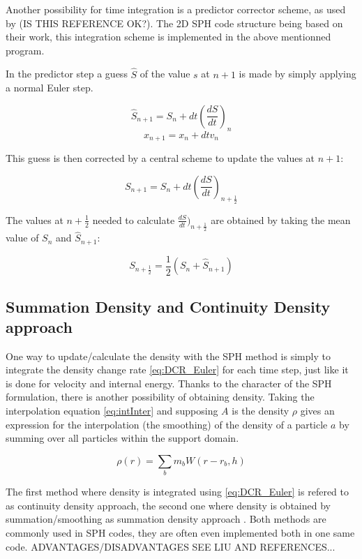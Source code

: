 \documentclass{report}
\begin{document}
Another possibility for time integration is a predictor corrector scheme, as
used by \cite{Hu2007}(IS THIS REFERENCE OK?). The 2D SPH code structure being based on their work,
this integration scheme is implemented in the above mentionned program.

In the predictor step a guess $\hat S$ of the value $s$ at $n+1$ is made by simply
applying a normal Euler step.

\begin{equation}
\hat S_{n+1}=S_n+dt\left(\frac{dS}{dt}\right)_n
\end{equation}
\begin{equation}
x_{n+1}=x_n+dt v_{n}
\end{equation}

This guess is then corrected by a central scheme to update the values at
$n+1$:

\begin{equation}
S_{n+1}=S_n+dt\left(\frac{dS}{dt}\right)_{n+\frac{1}{2}}
\end{equation}

The values at $n+\frac{1}{2}$ needed to calculate
$\frac{dS}{dt})_{n+\frac{1}{2}}$ are obtained by taking the mean value of
$S_n$ and $\hat S_{n+1}$:

\begin{equation}
S_{n+\frac{1}{2}}=\frac{1}{2}(S_n+\hat S_{n+1})
\end{equation}

\subsection{Summation Density and Continuity Density approach}
\label{sec:DensCalcMode}
One way to update/calculate the density with the SPH method is simply to integrate the density change rate \ref{eq:DCR_Euler} for each time step, just like it is done for velocity and internal energy. Thanks to the character of the SPH formulation, there is another possibility of obtaining density. Taking the interpolation equation \ref{eq:intInter} and supposing $A$ is the density $\rho$ gives an expression for the interpolation (the smoothing) of the density of a particle $a$ by summing over all particles within the support domain\cite{Monaghan2005}.

\begin{equation}
\label{eq:SumDensity}
\rho(r)=\sum_b m_b W(r-r_b,h)
\end{equation}

The first method where density is integrated using \ref{eq:DCR_Euler} is refered to as continuity density approach, the second one where density is obtained by summation/smoothing as summation density approach \cite{Liu2003}. Both methods are commonly used in SPH codes, they are often even implemented both in one same code. ADVANTAGES/DISADVANTAGES SEE LIU AND REFERENCES...
\end{document}
